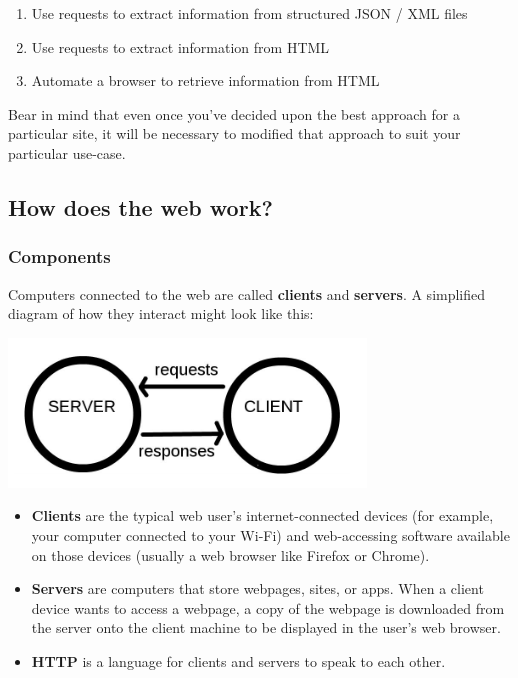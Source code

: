 \documentclass[
]{book}
\providecommand{\tightlist}{%
  \setlength{\itemsep}{0pt}\setlength{\parskip}{0pt}}
\begin{document}
\begin{enumerate}
\def\labelenumi{\arabic{enumi}.}
\tightlist
\item
  Use requests to extract information from structured JSON / XML files
\item
  Use requests to extract information from HTML
\item
  Automate a browser to retrieve information from HTML
\end{enumerate}

Bear in mind that even once you've decided upon the best approach for a particular site,
it will be necessary to modified that approach to suit your particular use-case.

\hypertarget{how-does-the-web-work}{%
\subsection{How does the web work?}\label{how-does-the-web-work}}

\hypertarget{components}{%
\subsubsection{Components}\label{components}}

Computers connected to the web are called \textbf{clients} and \textbf{servers}. A simplified diagram of how they interact might look like this:

\includegraphics{Python/PythonWebScrape/images/client_server.png}

\begin{itemize}
\tightlist
\item
  \textbf{Clients} are the typical web user's internet-connected devices (for example, your computer connected to your Wi-Fi) and web-accessing software available on those devices (usually a web browser like Firefox or Chrome).
\item
  \textbf{Servers} are computers that store webpages, sites, or apps. When a client device wants to access a webpage, a copy of the webpage is downloaded from the server onto the client machine to be displayed in the user's web browser.
\item
  \textbf{HTTP} is a language for clients and servers to speak to each other.
\end{itemize}
\end{document}
